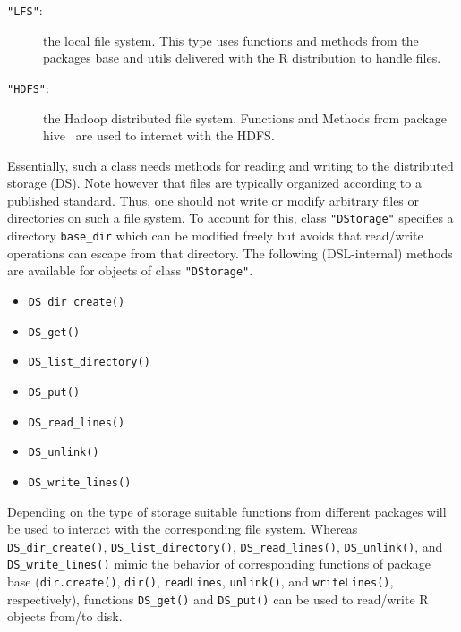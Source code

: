 \documentclass[fleqn]{article}
\newcommand{\pkg}[1]{{\normalfont\fontseries{b}\selectfont #1}}
\let\code=\texttt
\let\proglang=\textsf
\newcommand{\class}[1]{\code{"#1"}}
\begin{document}
\begin{description}
\item[\code{"LFS"}:] the local file system. This type uses functions
  and methods from the packages \pkg{base} and \pkg{utils} delivered
  with the \proglang{R} distribution to handle files.
\item[\code{"HDFS"}:] the Hadoop distributed file system. Functions
  and Methods from package
  \pkg{hive}~\citep[][]{Theussl+Feinerer:2011} are used to interact
  with the HDFS.
\end{description}

Essentially, such a class needs methods for reading and writing to the
distributed storage (DS). Note however that files are typically
organized according to a published standard. Thus, one should not
write or modify arbitrary files or directories on such a file
system. To account for this, class \class{DStorage} specifies a
directory \code{base\_dir} which can be modified freely but avoids
that read/write operations can escape from that directory. The
following (\pkg{DSL}-internal) methods are available for objects of
class \class{DStorage}.

\begin{itemize}
\item \code{DS\_dir\_create()}
\item \code{DS\_get()}
\item \code{DS\_list\_directory()}
\item \code{DS\_put()}
\item \code{DS\_read\_lines()}
\item \code{DS\_unlink()}
\item \code{DS\_write\_lines()}
\end{itemize}

Depending on the type of storage suitable functions from different
packages will be used to interact with the corresponding file
system. Whereas \code{DS\_dir\_create()},
\code{DS\_list\_directory()}, \code{DS\_read\_lines()},
\code{DS\_unlink()}, and \code{DS\_write\_lines()} mimic the behavior
of corresponding functions of package \pkg{base} (\code{dir.create()},
\code{dir()}, \code{readLines}, \code{unlink()}, and
\code{writeLines()}, respectively), functions \code{DS\_get()} and
\code{DS\_put()} can be used to read/write \proglang{R} objects from/to
disk.
\end{document}
